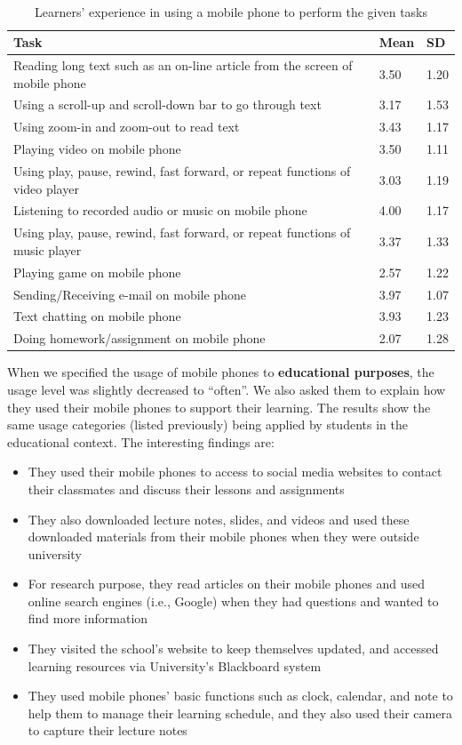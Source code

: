 \documentclass[a4paper,twoside]{article}
\begin{document}
\begin{table}
\centering
\caption{Learners' experience in using a mobile phone to perform the given tasks}\
\begin{tabular}[BP]{ | p{11.0cm} | p{1.2cm} | p{1.2cm} |}
\hline Task & Mean & SD\\ 
\hline Reading long text such as an on-line article from the screen of mobile phone & 3.50 & 1.20\\
\hline Using a scroll-up and scroll-down bar to go through text & 3.17 & 1.53 \\
\hline Using zoom-in and zoom-out to read text & 3.43 &1.17\\
\hline Playing video on mobile phone & 3.50 & 1.11\\
\hline Using play, pause, rewind, fast forward, or repeat functions of video player & 3.03 &1.19\\
\hline Listening to recorded audio or music on mobile phone &4.00 &1.17\\
\hline Using play, pause, rewind, fast forward, or repeat functions of music player &3.37 &1.33\\
\hline Playing game on mobile phone &2.57 & 1.22\\
\hline Sending/Receiving e-mail on mobile phone & 3.97 &1.07\\
\hline Text chatting on mobile phone & 3.93 &1.23\\
\hline Doing homework/assignment on mobile phone&2.07&1.28\\
\hline
\end{tabular}
\end{table}
When we specified the usage of mobile phones to \textbf{educational purposes}, the usage level was slightly decreased to ``often''. We also asked them to explain how they used their mobile phones to support their learning. The results show the same usage categories (listed previously) being applied by students in the educational context. The interesting findings are: 
\begin{itemize}
\item{They used their mobile phones to access to social media websites to contact their classmates and discuss their lessons and assignments}
\item{They also downloaded lecture notes, slides, and videos and used these downloaded materials from their mobile phones when they were outside university}
\item{For research purpose, they read articles on their mobile phones and used online search engines (i.e., Google) when they had questions and wanted to find more information}
\item{They visited the school's website to keep themselves updated, and accessed learning resources via University's Blackboard system}
\item{They used mobile phones' basic functions such as clock, calendar, and note to help them to manage their learning schedule, and they also used their camera to capture their lecture notes}
\end{itemize} 
\end{document}
